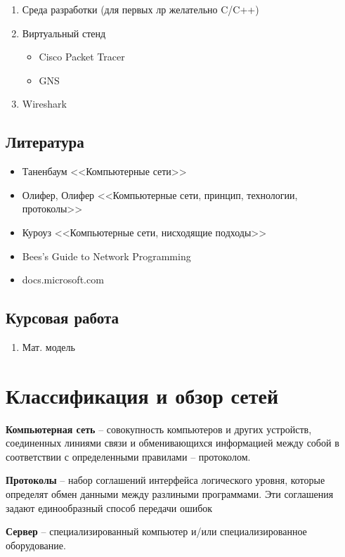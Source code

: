 \begin{enumerate}
    \item Среда разработки (для первых лр желательно C/C++)
    \item Виртуальный стенд
        \begin{itemize}
            \item Cisco Packet Tracer
            \item GNS
        \end{itemize}
    \item Wireshark
\end{enumerate}

\subsection{Литература}

\begin{itemize}
    \item Таненбаум <<Компьютерные сети>>
    \item Олифер, Олифер <<Компьютерные сети, принцип, технологии, протоколы>>
    \item Куроуз <<Компьютерные сети, нисходящие подходы>>
    \item Bees's Guide to Network Programming
    \item docs.microsoft.com
\end{itemize}

\subsection{Курсовая работа}

\begin{enumerate}
    \item Мат. модель
\end{enumerate}

\section{Классификация и обзор сетей}

\textbf{Компьютерная сеть} -- совокупность компьютеров и других устройств, соединенных линиями связи и обменивающихся информацией между собой в соответствии с определенными правилами -- протоколом.

\textbf{Протоколы} -- набор соглашений интерфейса логического уровня, которые определят обмен данными между разлиными программами. Эти соглашения задают единообразный способ передачи ошибок

\textbf{Сервер} -- специализированный компьютер и/или специализированное оборудование.




